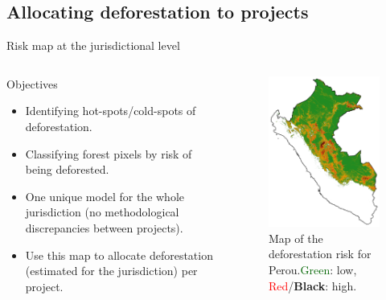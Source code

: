 \documentclass[10pt,table,dvipsnames,compress]{beamer}
\begin{document}
\subsection{Allocating deforestation to projects}
\label{allocating-deforestation-to-projects}
\begin{frame}[label=risk-map-at-the-jurisdictional-level]{Risk map at the jurisdictional level}
\begin{columns}
\begin{column}{0.5\columnwidth}
\begin{block}{Objectives}
\begin{itemize}
\item Identifying hot-spots/cold-spots of deforestation.
\item Classifying forest pixels by risk of being deforested.
\item One unique model for the whole jurisdiction (no methodological discrepancies between projects).
\item Use this map to allocate deforestation (estimated for the jurisdiction) per project.
\end{itemize}
\end{block}
\end{column}

\begin{column}{0.5\columnwidth}
\begin{figure}[htbp]
\centering
\includegraphics[width=4cm]{figs/prob_PER.png}
\caption{Map of the deforestation risk for Perou.\newline \textcolor{darkgreen}{Green}: low, \textcolor{red}{Red}/\textbf{Black}: high.}
\end{figure}
\end{column}
\end{columns}
\end{frame}
\end{document}

